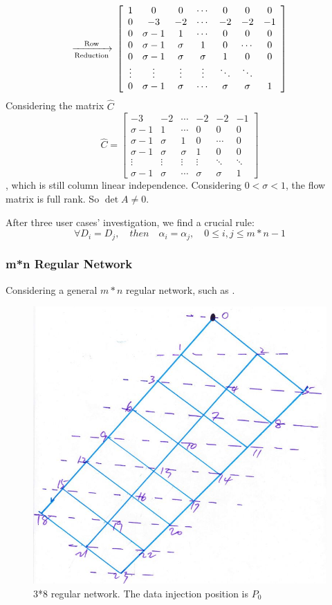 \begin{equation*}
{\xrightarrow[\text{Reduction}]{\text{Row}}\\
\left[ \begin{array}{ccccccc}
1 & 0 & 0 & \cdots & 0 & 0 & 0\\
0 & -3 & -2 & \cdots& -2 & -2 & -1\\
0 & \sigma-1 & 1 & \cdots & 0 & 0 & 0 \\
0 & \sigma-1 & \sigma & 1 & 0 & \cdots & 0 \\
0 & \sigma-1 & \sigma & \sigma & 1 & 0 & 0 \\
\vdots & \vdots & \vdots  &   \vdots & \ddots & \ddots\\
0 & \sigma-1 & \sigma & \cdots & \sigma & \sigma & 1
\end{array} 
\right ]
}
\end{equation*}
Considering the matrix $\hat{C}$
\begin{equation}
{
\hat{C} = \left[ \begin{array}{cccccc}
-3 & -2 & \cdots& -2 & -2 & -1\\
\sigma-1 & 1 & \cdots & 0 & 0 & 0 \\
\sigma-1 & \sigma & 1 & 0 & \cdots & 0 \\
\sigma-1 & \sigma & \sigma & 1 & 0 & 0 \\
\vdots & \vdots & \vdots  &   \vdots & \ddots & \ddots\\
\sigma-1 & \sigma & \cdots & \sigma & \sigma & 1
\end{array} 
\right ]
}
\end{equation}
, which is still column linear independence.  Considering $0 < \sigma < 1$, the flow matrix is full rank. So $\det A \neq 0$.

After three user cases' investigation, we find a crucial rule:
\textbf{$$\forall D_{i} = D_{j}, \quad then \quad \alpha_{i} = \alpha_{j},  \quad  0 \leq i,  j \leq m*n-1$$}

\newpage

\subsubsection*{m*n Regular Network}
Considering a general $m*n$ regular network,  such as  .  

\begin{figure}[!ht]
\centering
\includegraphics[width=0.55\columnwidth]{figure/3t8.JPG}
\caption{3*8 regular network.  The data injection position is $P_{0}$}
\label{fig:3t8}
\end{figure}

